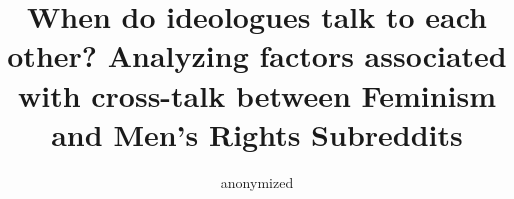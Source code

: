 \documentclass[letterpaper]{article}
\newcommand{\pat}[1]{{\textcolor{red}{Pat: #1}}}
\begin{document}
\title{When do ideologues talk to each other? Analyzing factors associated with cross-talk between Feminism and Men's Rights Subreddits}


\author{anonymized}

\maketitle
\end{document}
